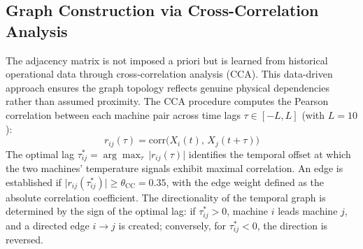 \subsection{Graph Construction via Cross-Correlation Analysis}
The adjacency matrix is not imposed a priori but is learned from historical operational data through cross-correlation analysis (CCA). This data-driven approach ensures the graph topology reflects genuine physical dependencies rather than assumed proximity. The CCA procedure computes the Pearson correlation between each machine pair across time lags $\tau \in [-L, L]$ (with $L = 10$):
\begin{equation}
r_{ij}(\tau) = \mathrm{corr}\bigl(X_i(t),\, X_j(t + \tau)\bigr)
\end{equation}
The optimal lag $\tau_{ij}^* = \arg\max_{\tau}\, \lvert r_{ij}(\tau) \rvert$ identifies the temporal offset at which the two machines' temperature signals exhibit maximal correlation. An edge is established if $\lvert r_{ij}(\tau_{ij}^*) \rvert \geq \theta_{\text{CC}} = 0.35$, with the edge weight defined as the absolute correlation coefficient. The directionality of the temporal graph is determined by the sign of the optimal lag: if $\tau_{ij}^* > 0$, machine $i$ leads machine $j$, and a directed edge $i \rightarrow j$ is created; conversely, for $\tau_{ij}^* < 0$, the direction is reversed.
